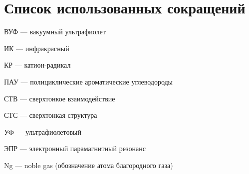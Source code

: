 \newpage
\section*{Список использованных сокращений}
ВУФ --- вакуумный ультрафиолет

ИК --- инфракрасный

КР --- катион-радикал

ПАУ --- полициклические ароматические углеводороды

СТВ --- сверхтонкое взаимодействие

СТС --- сверхтонкая структура

УФ --- ультрафиолетовый

ЭПР --- электронный парамагнитный резонанс

Ng --- noble gas (обозначение атома благородного газа)
